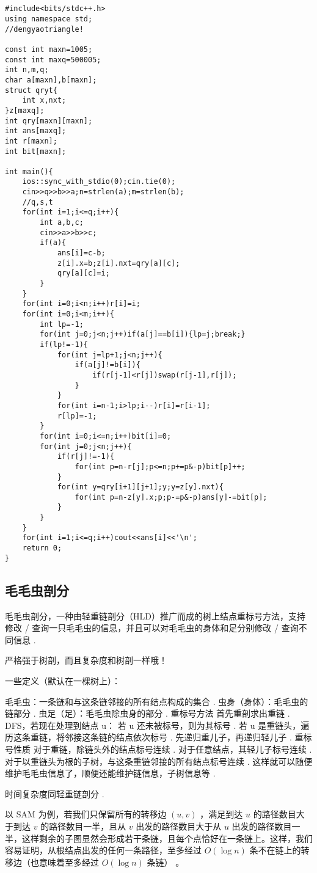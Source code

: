 \documentclass[12pt]{ctexart}
\begin{document}
\begin{lstlisting}


#include<bits/stdc++.h>
using namespace std;
//dengyaotriangle!

const int maxn=1005;
const int maxq=500005;
int n,m,q;
char a[maxn],b[maxn];
struct qryt{
    int x,nxt;
}z[maxq];
int qry[maxn][maxn];
int ans[maxq];
int r[maxn];
int bit[maxn];

int main(){
    ios::sync_with_stdio(0);cin.tie(0);
    cin>>q>>b>>a;n=strlen(a);m=strlen(b);
	//q,s,t
    for(int i=1;i<=q;i++){
        int a,b,c;
        cin>>a>>b>>c;
        if(a){
            ans[i]=c-b;
            z[i].x=b;z[i].nxt=qry[a][c];
            qry[a][c]=i;
        }
    }    
    for(int i=0;i<n;i++)r[i]=i;
    for(int i=0;i<m;i++){
        int lp=-1;
        for(int j=0;j<n;j++)if(a[j]==b[i]){lp=j;break;}
        if(lp!=-1){
            for(int j=lp+1;j<n;j++){
                if(a[j]!=b[i]){
                    if(r[j-1]<r[j])swap(r[j-1],r[j]);
                }
            }
            for(int i=n-1;i>lp;i--)r[i]=r[i-1];
            r[lp]=-1;
        }
        for(int i=0;i<=n;i++)bit[i]=0;
        for(int j=0;j<n;j++){
            if(r[j]!=-1){
                for(int p=n-r[j];p<=n;p+=p&-p)bit[p]++;
            }
            for(int y=qry[i+1][j+1];y;y=z[y].nxt){
                for(int p=n-z[y].x;p;p-=p&-p)ans[y]-=bit[p];
            }
        }
    }
    for(int i=1;i<=q;i++)cout<<ans[i]<<'\n';
    return 0;
}
\end{lstlisting}

\subsection{毛毛虫剖分}
毛毛虫剖分，一种由轻重链剖分（HLD）推广而成的树上结点重标号方法，支持修改 / 查询一只毛毛虫的信息，并且可以对毛毛虫的身体和足分别修改 / 查询不同信息 .

严格强于树剖，而且复杂度和树剖一样哦！

一些定义（默认在一棵树上）：

毛毛虫：一条链和与这条链邻接的所有结点构成的集合 .
虫身（身体）：毛毛虫的链部分 .
虫足（足）：毛毛虫除虫身的部分 .
重标号方法
首先重剖求出重链 .
DFS，若现在处理到结点 u：
若 u 还未被标号，则为其标号 .
若 u 是重链头，遍历这条重链，将邻接这条链的结点依次标号 .
先递归重儿子，再递归轻儿子 .
重标号性质
对于重链，除链头外的结点标号连续 .
对于任意结点，其轻儿子标号连续 .
对于以重链头为根的子树，与这条重链邻接的所有结点标号连续 .
这样就可以随便维护毛毛虫信息了，顺便还能维护链信息，子树信息等 .

时间复杂度同轻重链剖分 .

以 SAM 为例，若我们只保留所有的转移边 $(u,v)$ ，满足到达 $u$ 的路径数目大于到达 $v$ 的路径数目一半，且从 $v$ 出发的路径数目大于从 $u$ 出发的路径数目一半，这样剩余的子图显然会形成若干条链，且每个点恰好在一条链上。这样，我们容易证明，从根结点出发的任何一条路径，至多经过 $O(\log n)$ 条不在链上的转移边（也意味着至多经过 $O(\log n)$ 条链） 。
\end{document}
